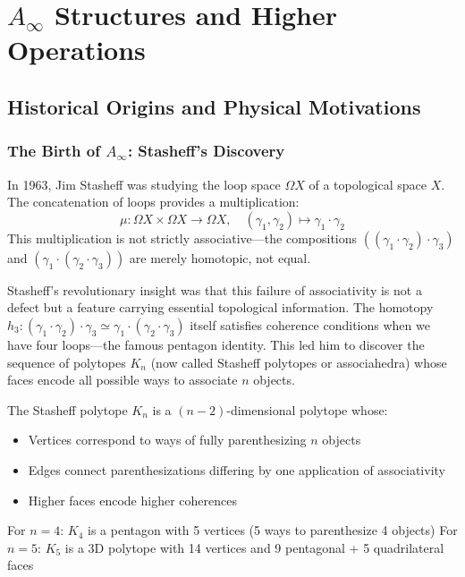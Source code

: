 \section{$A_\infty$ Structures and Higher Operations}


\subsection{Historical Origins and Physical Motivations}

\subsubsection{The Birth of $A_\infty$: Stasheff's Discovery}

In 1963, Jim Stasheff was studying the loop space $\Omega X$ of a topological space $X$. The concatenation of loops provides a multiplication:
$$\mu: \Omega X \times \Omega X \to \Omega X, \quad (\gamma_1, \gamma_2) \mapsto \gamma_1 \cdot \gamma_2$$
This multiplication is not strictly associative—the compositions $((\gamma_1 \cdot \gamma_2) \cdot \gamma_3)$ and $(\gamma_1 \cdot (\gamma_2 \cdot \gamma_3))$ are merely homotopic, not equal. 

Stasheff's revolutionary insight was that this failure of associativity is not a defect but a feature carrying essential topological information. The homotopy $h_3: (\gamma_1 \cdot \gamma_2) \cdot \gamma_3 \simeq \gamma_1 \cdot (\gamma_2 \cdot \gamma_3)$ itself satisfies coherence conditions when we have four loops—the famous pentagon identity. This led him to discover the sequence of polytopes $K_n$ (now called Stasheff polytopes or associahedra) whose faces encode all possible ways to associate $n$ objects.

\begin{remark}
The Stasheff polytope $K_n$ is a $(n-2)$-dimensional polytope whose:
\begin{itemize}
\item Vertices correspond to ways of fully parenthesizing $n$ objects
\item Edges connect parenthesizations differing by one application of associativity
\item Higher faces encode higher coherences
\end{itemize}
For $n=4$: $K_4$ is a pentagon with 5 vertices (5 ways to parenthesize 4 objects)
For $n=5$: $K_5$ is a 3D polytope with 14 vertices and 9 pentagonal + 5 quadrilateral faces
\end{remark}

